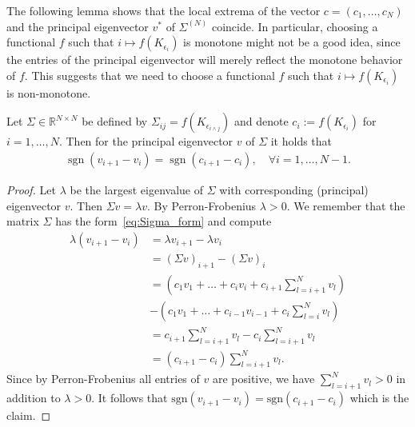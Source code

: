 The following lemma shows that the local extrema of the vector $c=(c_1,\dots,c_N)$ and the principal eigenvector $v^*$ of $\Sigma^{(N)}$ coincide. In particular, choosing a functional $f$ such that $i\mapsto f(K_{\epsilon_i})$ is monotone might not be a good idea, since the entries of the principal eigenvector will merely reflect the monotone behavior of $f$. This suggests that we need to choose a functional $f$ such that $i\mapsto f(K_{\epsilon_i})$ is non-monotone.


\begin{Lem}
    Let $\Sigma\in\mathbb{R}^{N\times N}$ be defined by $\Sigma_{ij}=f(K_{\epsilon_{i\wedge j}})$ and denote $c_i:=f(K_{\epsilon_i})$ for $i=1,\dots,N$. Then for the principal eigenvector $v$ of $\Sigma$ it holds that
    \begin{align*}
        \operatorname{sgn}(v_{i+1}-v_i)=\operatorname{sgn}(c_{i+1}-c_i),\quad\forall i=1,\dots,N-1.
    \end{align*}
\end{Lem}
\begin{proof}
    Let $\lambda$ be the largest eigenvalue of $\Sigma$ with corresponding (principal) eigenvector $v$. Then $\Sigma v=\lambda v$. By Perron-Frobenius $\lambda>0$. We remember that the matrix $\Sigma$ has the form~\eqref{eq:Sigma_form} and compute
    \begin{align*}
        \lambda(v_{i+1}-v_i)&=\lambda v_{i+1}-\lambda v_i\\&
        =(\Sigma v)_{i+1}-(\Sigma v)_i\\&
        =\left(c_1v_1+\dots+c_{i}v_{i}+c_{i+1}\sum_{l=i+1}^{N}v_l\right)\\&-\left(c_1v_1+\dots+c_{i-1}v_{i-1}+c_i\sum_{l=i}^{N}v_l\right)\\&
        =c_{i+1}\sum_{l=i+1}^{N}v_l-c_i\sum_{l=i+1}^{N}v_l\\&
        =(c_{i+1}-c_i)\sum_{l=i+1}^{N}v_l.
    \end{align*}
    Since by Perron-Frobenius all entries of $v$ are positive, we have $\sum_{l=i+1}^{N}v_l>0$ in addition to $\lambda>0$. It follows that $\text{sgn}(v_{i+1}-v_i)=\text{sgn}(c_{i+1}-c_i)$ which is the claim.
\end{proof}


